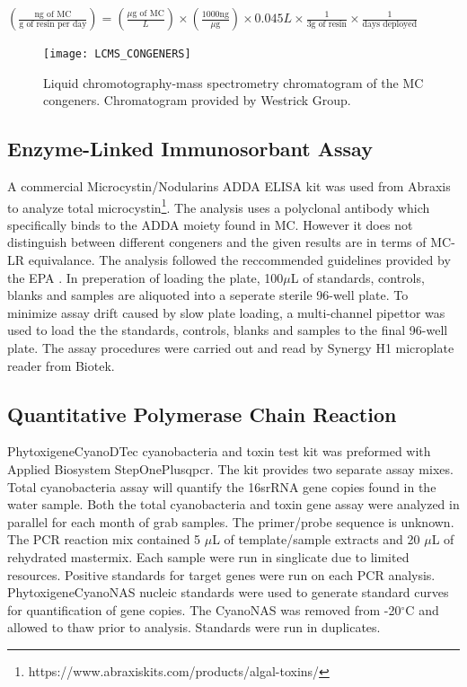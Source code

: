 \begin {center} 
$(\frac{\text{ng of MC}}{\text{g of resin per day}}) =(\frac{\text{$\mu$g of MC}}{L}) \times (\frac{\text{1000ng}}{\text{$\mu$g}}) \times {0.045L} \times \frac{1}{\text{3g of resin}} \times \frac{1}{\text{days deployed}}$
\end{center}


\begin{figure}[!h]
\centering
\texttt{[image: LCMS\_CONGENERS]}
\caption{Liquid chromotography-mass spectrometry chromatogram of the MC congeners. Chromatogram provided by Westrick Group.}
\label{fig:spectra}
\end{figure}

\clearpage

\subsection{Enzyme-Linked Immunosorbant Assay}

A commercial Microcystin/Nodularins ADDA ELISA kit was used from Abraxis to analyze total microcystin\footnote{https://www.abraxiskits.com/products/algal-toxins/}. The analysis uses a polyclonal antibody which specifically binds to the ADDA moiety found in MC. However it does not distinguish between different congeners and the given results are in terms of MC-LR equivalance. The analysis followed the reccommended guidelines provided by the EPA \cite{usepa_method_2016}. In preperation of loading the plate,  100$\mu$L of standards, controls, blanks and samples are aliquoted into a seperate sterile 96-well plate. To minimize assay drift caused by slow plate loading, a multi-channel pipettor was used to load the the standards, controls, blanks and samples to the final 96-well plate. The assay procedures were carried out and read by Synergy H1 microplate reader from Biotek.

\subsection{Quantitative Polymerase Chain Reaction}

Phytoxigene\texttrademark  CyanoDTec cyanobacteria and toxin test kit was preformed with Applied Biosystem StepOnePlus\texttrademark \gls{qpcr}. The kit provides two separate assay mixes. Total cyanobacteria assay will quantify the 16srRNA gene copies found in the water sample. Both the total cyanobacteria and toxin gene assay  were analyzed in parallel for each month of grab samples. The primer/probe sequence is unknown.  The PCR reaction mix contained 5 $\mu$L of template/sample extracts and 20 $\mu$L of rehydrated mastermix.  Each sample were run in singlicate due to limited resources. Positive standards for target genes  were run on each PCR analysis. Phytoxigene\texttrademark  CyanoNAS nucleic standards were used to generate standard curves for quantification of gene copies. The CyanoNAS was removed from -20$^\circ$C and allowed to thaw prior to analysis.  Standards were run in duplicates.

